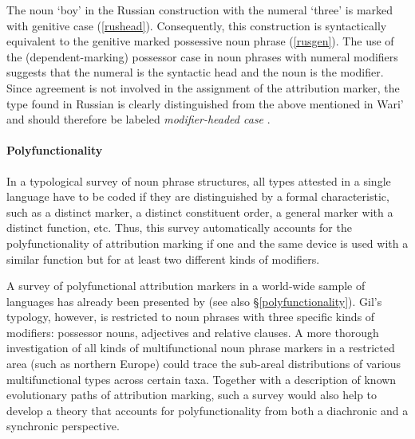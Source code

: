 The noun ‘boy’ in the Russian construction with the numeral ‘three’ is marked with genitive case (\ref{rushead}). Consequently, this construction is syntactically equivalent to the genitive marked possessive noun phrase (\ref{rusgen}). The use of the (dependent\hyp{}marking) possessor case in noun phrases with numeral modifiers suggests that the numeral is the syntactic head and the noun is the modifier. Since agreement is not involved in the assignment of the attribution marker, the type found in Russian is clearly distinguished from the above mentioned  in Wari' and should therefore be labeled \textit{modifier\hyp{}headed case} \citep[cf.][]{AUTOTYP-NP}.

\paragraph*{Polyfunctionality} 
In a typological survey of noun phrase structures, all types attested in a single language have to be coded if they are distinguished by a formal characteristic, such as a distinct marker, a distinct constituent order, a general marker with a distinct function, etc. Thus, this survey automatically accounts for the polyfunctionality of attribution marking if one and the same device is used with a similar function but for at least two different kinds of modifiers.

A survey of polyfunctional attribution markers in a world-wide sample of languages has already been presented by \citet{gil2005} (see also \S\ref{polyfunctionality}). Gil's typology, however, is restricted to noun phrases with three specific kinds of modifiers: possessor nouns, adjectives and relative clauses. A more thorough investigation of all kinds of multifunctional noun phrase markers in a restricted area (such as northern Europe) could trace the sub-areal distributions of various multifunctional types across certain taxa. Together with a description of known evolutionary paths of attribution marking, such a survey would also help to develop a theory that accounts for polyfunctionality from both a diachronic and a synchronic perspective.
